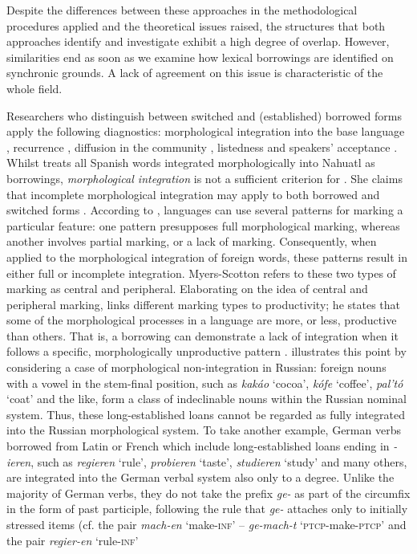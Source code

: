 Despite the differences between these approaches in the methodological procedures applied and the theoretical issues raised, the structures that both approaches identify and investigate exhibit a high degree of overlap. However, similarities end as soon as we examine how lexical borrowings are identified on synchronic grounds. A lack of agreement on this issue is characteristic of the whole field.

Researchers who distinguish between switched and (established) borrowed forms apply the following diagnostics: morphological integration into the base language \citep{macswan-2000}, recurrence \citep{poplack-sankoff-1984, myers-scotton-duelling-1993}, diffusion in the community \citep{poplack-etal-1988,poplack18}, listedness \citep{milroy-code-switching-1995, muysken-bilingual-2000, muhamedowa-untersuchung-2006, stammers-deuchar-2012} and speakers' acceptance \citep{poplack-sankoff-1984}. Whilst \citet{macswan-2000} treats all Spanish words integrated morphologically into Nahuatl as borrowings, \textit{morphological integration} is not a sufficient criterion for \citet{myers-scotton-duelling-1993}. She claims that incomplete morphological integration may apply to both borrowed and switched forms \citep[191]{myers-scotton-duelling-1993}. According to \citet[183--188]{myers-scotton-duelling-1993}, languages can use several patterns for marking a particular feature: one pattern presupposes full morphological marking, whereas another involves partial marking, or a lack of marking. Consequently, when applied to the morphological integration of foreign words, these patterns result in either full or incomplete integration. Myers-Scotton refers to these two types of marking as central and peripheral. Elaborating on the idea of central and peripheral marking, \citet[52--53]{boumans-syntax-1998} links different marking types to productivity; he states that some of the morphological processes in a language are more, or less, productive than others. That is, a borrowing can demonstrate a lack of integration when it follows a specific, morphologically unproductive pattern \citep[cf.][]{dressler04}. \citet[45]{muhamedowa-untersuchung-2006} illustrates this point by considering a case of morphological non-integration in Russian: foreign nouns with a vowel in the stem-final position, such as \textit{kak\'{a}o} `cocoa', \textit{k\'{o}fe} `coffee', \textit{pal't\'{o}} `coat' and the like, form a class of indeclinable nouns within the Russian nominal system. Thus, these long-established loans cannot be regarded as fully integrated into the Russian morphological system. To take another example, German verbs borrowed from Latin or French which include long-established loans ending in \textit{-ieren}, such as \textit{regieren} `rule', \textit{probieren} `taste', \textit{studieren} `study' and many others, are integrated into the German verbal system also only to a degree. Unlike the majority of German verbs, they do not take the prefix \textit{ge-} as part of the circumfix in the form of past participle, following the rule that \textit{ge-} attaches only to initially stressed items (cf. the pair \textit{mach-en} `make-\textsc{inf}' -- \textit{ge-mach-t} `\textsc{ptcp}-make-\textsc{ptcp}' and  the pair \textit{regier-en} `rule-\textsc{inf}' 